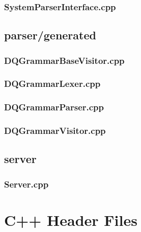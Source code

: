 \subsubsection*{SystemParserInterface.cpp}


\subsection*{parser/generated}

\subsubsection*{DQGrammarBaseVisitor.cpp}


\subsubsection*{DQGrammarLexer.cpp}


\subsubsection*{DQGrammarParser.cpp}


\subsubsection*{DQGrammarVisitor.cpp}


\subsection*{server}

\subsubsection*{Server.cpp}


\section{C++ Header Files}

